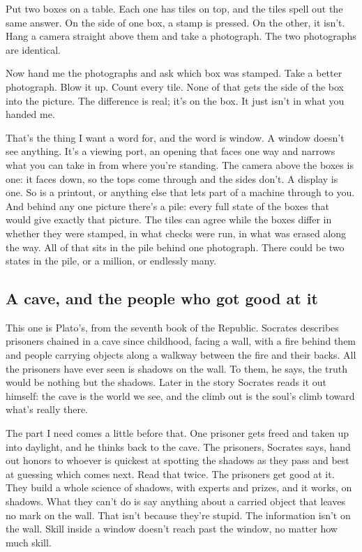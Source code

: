 \documentclass[11pt,twoside]{article}
\theoremstyle{thielethm}
\theoremstyle{thieledef}
\theoremstyle{thieledef}
\theoremstyle{thieledef}
\theoremstyle{thielethm}
\theoremstyle{thieleobs}
\theoremstyle{thielethm}
\begin{document}
Put two boxes on a table. Each one has tiles on top, and the tiles spell out the same answer. On the side of one box, a stamp is pressed. On the other, it isn't. Hang a camera straight above them and take a photograph. The two photographs are identical.

Now hand me the photographs and ask which box was stamped. Take a better photograph. Blow it up. Count every tile. None of that gets the side of the box into the picture. The difference is real; it's on the box. It just isn't in what you handed me.

That's the thing I want a word for, and the word is window. A window doesn't see anything. It's a viewing port, an opening that faces one way and narrows what you can take in from where you're standing. The camera above the boxes is one: it faces down, so the tops come through and the sides don't. A display is one. So is a printout, or anything else that lets part of a machine through to you. And behind any one picture there's a pile: every full state of the boxes that would give exactly that picture. The tiles can agree while the boxes differ in whether they were stamped, in what checks were run, in what was erased along the way. All of that sits in the pile behind one photograph. There could be two states in the pile, or a million, or endlessly many.

\subsection{A cave, and the people who got good at it}

This one is Plato's, from the seventh book of the Republic. Socrates describes prisoners chained in a cave since childhood, facing a wall, with a fire behind them and people carrying objects along a walkway between the fire and their backs. All the prisoners have ever seen is shadows on the wall. To them, he says, the truth would be nothing but the shadows. Later in the story Socrates reads it out himself: the cave is the world we see, and the climb out is the soul's climb toward what's really there.

The part I need comes a little before that. One prisoner gets freed and taken up into daylight, and he thinks back to the cave. The prisoners, Socrates says, hand out honors to whoever is quickest at spotting the shadows as they pass and best at guessing which comes next. Read that twice. The prisoners get good at it. They build a whole science of shadows, with experts and prizes, and it works, on shadows. What they can't do is say anything about a carried object that leaves no mark on the wall. That isn't because they're stupid. The information isn't on the wall. Skill inside a window doesn't reach past the window, no matter how much skill.
\end{document}
